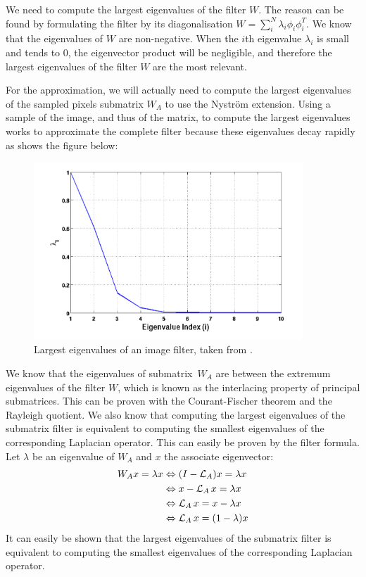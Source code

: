 We need to compute the largest eigenvalues of the filter \(W\).
The reason can be found by formulating the filter by its diagonalisation \(W = \sum_i^N \lambda_i \phi_i \phi_i^T\).
We know that the eigenvalues of \(W\) are non-negative.
When the \(i\)th eigenvalue \(\lambda_i\) is small and tends to 0, the eigenvector product will be negligible, and therefore the largest eigenvalues of the filter \(W\) are the most relevant.

\ifthesis
 For the approximation, we will actually need to compute the largest eigenvalues of the sampled pixels submatrix \(W_A\) to use the Nystr\"om extension.
 Using a sample of the image, and thus of the matrix, to compute the largest eigenvalues works to approximate the complete filter because these eigenvalues decay rapidly as shows the figure below:
 \begin{figure}[H]
   \centering
   \includegraphics[width=0.9\textwidth]{img/decayingEigenvalues.png}
   \caption{Largest eigenvalues of an image filter, taken from \cite{siam_slides_2016}.}
 \end{figure}
\fi

\ifthesis
 We know that the eigenvalues of submatrix\ \(W_A\) are between the extremum eigenvalues of the filter \(W\), which is known as the interlacing property of principal submatrices.
 This can be proven with the Courant-Fischer theorem and the Rayleigh quotient.
 We also know that computing the largest eigenvalues of the submatrix filter is equivalent to computing the smallest eigenvalues of the corresponding Laplacian operator.
 This can easily be proven by the filter formula.
 Let \(\lambda\) be an eigenvalue of \(W_A\) and \(x\) the associate eigenvector:
 \begin{equation}
  \begin{split}
      W_A x = \lambda x & \Leftrightarrow (I - \operatorname{\mathcal{L}}_A)x = \lambda x \\
                      & \Leftrightarrow x - \operatorname{\mathcal{L}}_A x = \lambda x \\
                      & \Leftrightarrow \operatorname{\mathcal{L}}_A x = x - \lambda x \\
                      & \Leftrightarrow \operatorname{\mathcal{L}}_A x = (1 - \lambda) x
  \end{split}
 \end{equation}
\else
 It can easily be shown that the largest eigenvalues of the submatrix filter is equivalent to computing the smallest eigenvalues of the corresponding Laplacian operator.
\fi

